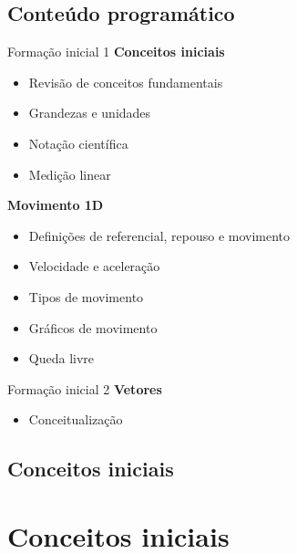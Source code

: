\documentclass{beamer}
\begin{document}
\subsection{Conteúdo programático}
%
\begin{frame}{Formação inicial 1}
    \textbf{Conceitos iniciais}
    \begin{itemize}
        \item Revisão de conceitos fundamentais
        \item Grandezas e unidades
        \item Notação científica
        \item Medição linear
    \end{itemize}
    \pause
    \textbf{Movimento 1D}
    \begin{itemize}
        \item Definições de referencial, repouso e movimento
        \item Velocidade e aceleração
        \item Tipos de movimento
        \item Gráficos de movimento
        \item Queda livre
    \end{itemize}
\end{frame}
%
\begin{frame}{Formação inicial 2}
    \textbf{Vetores}
    \begin{itemize}
        \item Conceitualização
    \end{itemize}
\end{frame}
\subsection{Conceitos iniciais}
\section{Conceitos iniciais}
%
\end{document}
